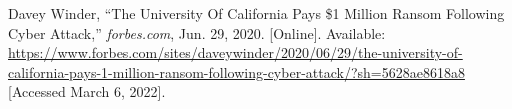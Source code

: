 \begin{thebibliography}{99}
    Davey Winder, ``The University Of California Pays \$1 Million Ransom Following Cyber Attack,''
    \textit{forbes.com}, Jun. 29, 2020. [Online].
    Available: \href{https://www.forbes.com/sites/daveywinder/2020/06/29/the-university-of-california-pays-1-million-ransom-following-cyber-attack/?sh=5628ae8618a8}{https://www.forbes.com/sites/daveywinder/2020/06/29/the-university-of-california-pays-1-million-ransom-following-cyber-attack/?sh=5628ae8618a8}
    [Accessed March 6, 2022].
\end{thebibliography}